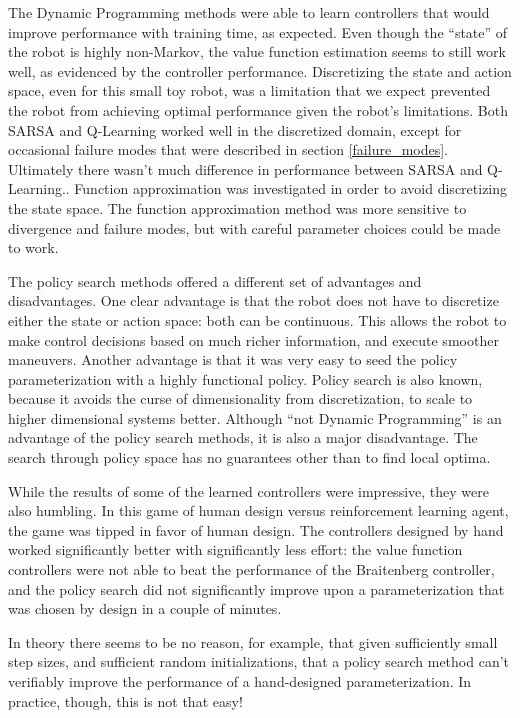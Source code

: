 \documentclass{article}
\begin{document}
The Dynamic Programming methods were able to learn controllers that would improve performance with training time, as expected.  Even though the ``state'' of the robot is highly non-Markov, the value function estimation seems to still work well, as evidenced by the controller performance.  Discretizing the state and action space, even for this small toy robot, was a limitation that we expect prevented the robot from achieving optimal performance given the robot's limitations. Both SARSA and Q-Learning worked well in the discretized domain, except for occasional failure modes that were described in section \ref{failure_modes}. Ultimately there wasn't much difference in performance between SARSA and Q-Learning.. Function approximation was investigated in order to avoid discretizing the state space. The function approximation method was more sensitive to divergence and failure modes, but with careful parameter choices could be made to work.

The policy search methods offered a different set of advantages and disadvantages.  One clear advantage is that the robot does not have to discretize either the state or action space: both can be continuous.  This allows the robot to make control decisions based on much richer information, and execute smoother maneuvers.  Another advantage is that it was very easy to seed the policy parameterization with a highly functional policy.  Policy search is also known, because it avoids the curse of dimensionality from discretization, to scale to higher dimensional systems better.  Although ``not Dynamic Programming'' is an advantage of the policy search methods, it is also a major disadvantage.  The search through policy space has no guarantees other than to find local optima.

While the results of some of the learned controllers were impressive, they were also humbling.  In this game of human design versus reinforcement learning agent, the game was tipped in favor of human design. The controllers designed by hand worked significantly better with significantly less effort:  the value function controllers were not able to beat the performance of the Braitenberg controller, and the policy search did not significantly improve upon a parameterization that was chosen by design in a couple of minutes.

In theory there seems to be no reason, for example, that given sufficiently small step sizes, and sufficient random initializations, that a policy search method can't verifiably improve the performance of a hand-designed parameterization. In practice, though, this is not that easy!
\end{document}
